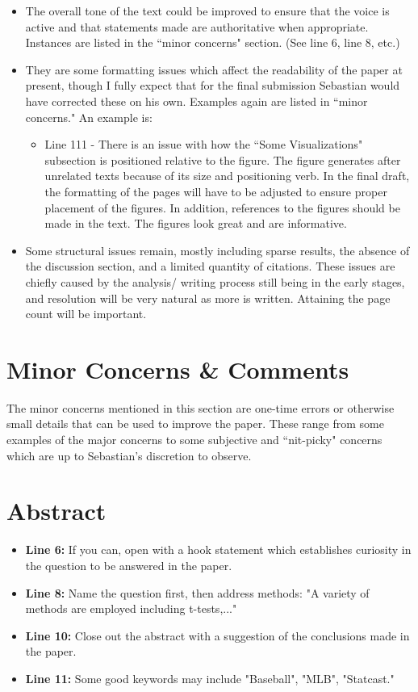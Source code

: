 \documentclass[12pt]{article}
\begin{document}
\begin{itemize}
    \item The overall tone of the text could be improved to ensure that the voice is active and that statements made are authoritative when appropriate. Instances are listed in the ``minor concerns" section. (See line 6, line 8, etc.)
    \item They are some formatting issues which affect the readability of the paper at present, though I fully expect that for the final submission Sebastian would have corrected these on his own. Examples again are listed in ``minor concerns." An example is:
        \begin{itemize}
            \item Line 111 - There is an issue with how the ``Some Visualizations" subsection is positioned relative to the figure. The figure generates after unrelated texts because of its size and positioning verb. In the final draft, the formatting of the pages will have to be adjusted to ensure proper placement of the figures. In addition, references to the figures should be made in the text. The figures look great and are informative.
        \end{itemize}
    \item Some structural issues remain, mostly including sparse results, the absence of the discussion section, and a limited quantity of citations. These issues are chiefly caused by the analysis/ writing process still being in the early stages, and resolution will be very natural as more is written. Attaining the page count will be important.
\end{itemize}

\section*{Minor Concerns \& Comments}

The minor concerns mentioned in this section are one-time errors or otherwise small details that can be used to improve the paper. These range from some examples of the major concerns to some subjective and ``nit-picky" concerns which are up to Sebastian's discretion to observe. 

\section*{Abstract}

\begin{itemize}
    \item \textbf{Line 6:} If you can, open with a hook statement which establishes curiosity in the question to be answered in the paper.
    \item \textbf{Line 8:} Name the question first, then address methods: "A variety of methods are employed including t-tests,..."
    \item \textbf{Line 10:} Close out the abstract with a suggestion of the conclusions made in the paper.
    \item \textbf{Line 11:} Some good keywords may include "Baseball", "MLB", "Statcast."
\end{itemize}
\end{document}
